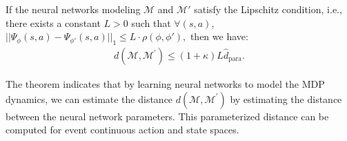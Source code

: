 \begin{theorem}
\label{the:network}
If the neural networks modeling $\mathcal{M}$ and $\mathcal{M}'$ satisfy the Lipschitz condition, i.e., there exists a constant $L > 0$ such that $\forall (s, a)$,  
\( ||\Psi_{\phi}(s, a) - \Psi_{\phi'}(s, a)||_1 \leq L \cdot \rho(\phi, \phi'), \)
then we have:
\begin{equation}
\begin{aligned}
   d(\mathcal{M},\mathcal{M}^{\prime}) \le (1+\kappa)L \hat{d}_{\text{para}}.
\end{aligned}
\end{equation}
\end{theorem}
The theorem indicates that by learning neural networks to model the MDP dynamics, we can estimate the distance $d(\mathcal{M},\mathcal{M}^{\prime})$ by estimating the distance between the neural network parameters. This parameterized distance can be computed for event continuous action and state spaces. 
















